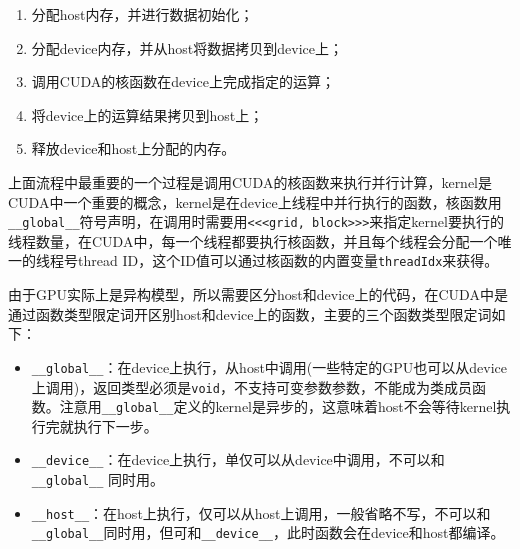 \documentclass[UTF-8, a4paper, 12pt]{ctexart}
\begin{document}
\begin{enumerate}
    \item 分配host内存，并进行数据初始化；
    \item 分配device内存，并从host将数据拷贝到device上；
    \item 调用CUDA的核函数在device上完成指定的运算；
    \item 将device上的运算结果拷贝到host上；
    \item 释放device和host上分配的内存。
\end{enumerate}

上面流程中最重要的一个过程是调用CUDA的核函数来执行并行计算，kernel是CUDA中一个重要的概念，kernel是在device上线程中并行执行的函数，核函数用\colorbox[gray]{0.9}{\texttt{\_\_global\_\_}}符号声明，在调用时需要用\colorbox[gray]{0.9}{\texttt{<<<grid, block>>>}}来指定kernel要执行的线程数量，在CUDA中，每一个线程都要执行核函数，并且每个线程会分配一个唯一的线程号thread ID，这个ID值可以通过核函数的内置变量\colorbox[gray]{0.9}{\texttt{threadIdx}}来获得。

由于GPU实际上是异构模型，所以需要区分host和device上的代码，在CUDA中是通过函数类型限定词开区别host和device上的函数，主要的三个函数类型限定词如下：
\begin{itemize}
    \item \colorbox[gray]{0.9}{\texttt{\_\_global\_\_}}：在device上执行，从host中调用(一些特定的GPU也可以从device上调用)，返回类型必须是\colorbox[gray]{0.9}{\texttt{void}}，不支持可变参数参数，不能成为类成员函数。注意用\colorbox[gray]{0.9}{\texttt{\_\_global\_\_}}定义的kernel是异步的，这意味着host不会等待kernel执行完就执行下一步。
    \item \colorbox[gray]{0.9}{\texttt{\_\_device\_\_}}：在device上执行，单仅可以从device中调用，不可以和\colorbox[gray]{0.9}{\texttt{\_\_global\_\_}} 同时用。
    \item \colorbox[gray]{0.9}{\texttt{\_\_host\_\_}}：在host上执行，仅可以从host上调用，一般省略不写，不可以和\colorbox[gray]{0.9}{\texttt{\_\_global\_\_}}同时用，但可和\colorbox[gray]{0.9}{\texttt{\_\_device\_\_}}，此时函数会在device和host都编译。
\end{itemize}
\end{document}
